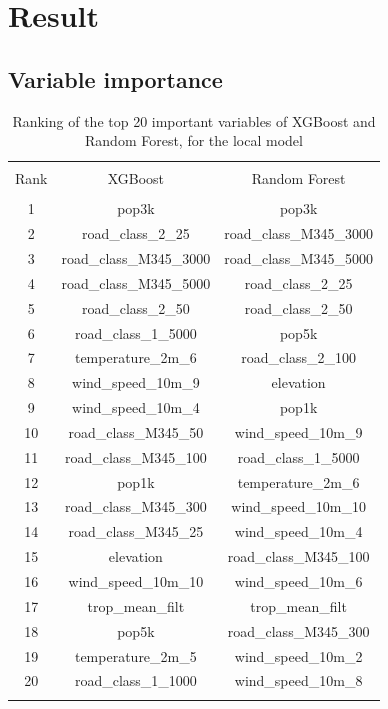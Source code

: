 \documentclass{article}
\begin{document}
\section{Result}
\subsection{Variable importance}

\begin{table}[!htbp] \centering 
  \caption{Ranking of the top 20 important variables of XGBoost and Random Forest, for the local model} 
    \label{nlde_vimp} 
\begin{tabular}{@{\extracolsep{5pt}} ccc} 
\\[-1.8ex]\hline 
\hline \\[-1.8ex] 
Rank & XGBoost & Random Forest \\ 
\hline \\[-1.8ex] 
1 & pop3k & pop3k \\ 
2 & road\_class\_2\_25 & road\_class\_M345\_3000 \\ 
3 & road\_class\_M345\_3000 & road\_class\_M345\_5000 \\ 
4 & road\_class\_M345\_5000 & road\_class\_2\_25 \\ 
5 & road\_class\_2\_50 & road\_class\_2\_50 \\ 
6 & road\_class\_1\_5000 & pop5k \\ 
7 & temperature\_2m\_6 & road\_class\_2\_100 \\ 
8 & wind\_speed\_10m\_9 & elevation \\ 
9 & wind\_speed\_10m\_4 & pop1k \\ 
10 & road\_class\_M345\_50 & wind\_speed\_10m\_9 \\ 
11 & road\_class\_M345\_100 & road\_class\_1\_5000 \\ 
12 & pop1k & temperature\_2m\_6 \\ 
13 & road\_class\_M345\_300 & wind\_speed\_10m\_10 \\ 
14 & road\_class\_M345\_25 & wind\_speed\_10m\_4 \\ 
15 & elevation & road\_class\_M345\_100 \\ 
16 & wind\_speed\_10m\_10 & wind\_speed\_10m\_6 \\ 
17 & trop\_mean\_filt & trop\_mean\_filt \\ 
18 & pop5k & road\_class\_M345\_300 \\ 
19 & temperature\_2m\_5 & wind\_speed\_10m\_2 \\ 
20 & road\_class\_1\_1000 & wind\_speed\_10m\_8 \\ 
\hline \\[-1.8ex] 
\end{tabular} 
\end{table} 
\end{document}
